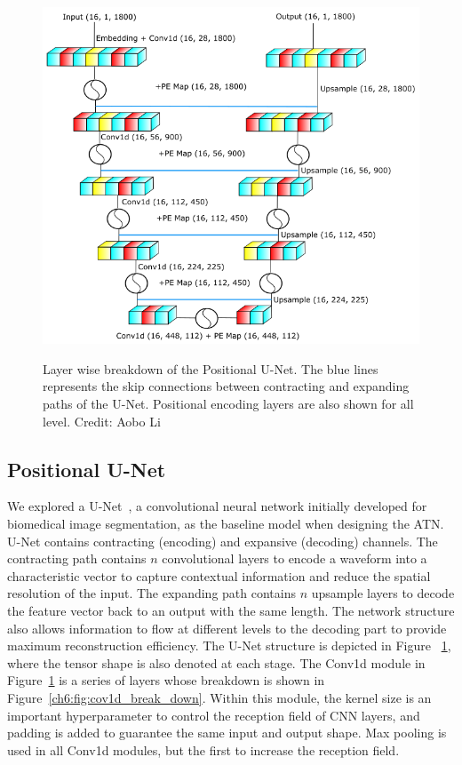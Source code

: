 
\begin{figure}[htb!]
\centering
    \includegraphics[width=0.7\linewidth]{ch6/figs/unet.png}
    \label{fig:cpunet}
    \caption{Layer wise breakdown of the Positional U-Net. The blue lines represents the  skip connections between contracting and expanding paths of the U-Net. Positional encoding layers are also shown for all level. Credit: Aobo Li}
   \label{fig:network_schematic}
\end{figure}



\subsection{Positional U-Net}

We explored a U-Net~\cite{UNet}, a convolutional neural network initially developed for biomedical image segmentation, as the baseline model when designing the ATN. U-Net contains contracting (encoding) and expansive (decoding) channels. The contracting path contains $n$ convolutional layers to encode a waveform into a characteristic vector to capture contextual information and reduce the spatial resolution of the input. The expanding path contains $n$ upsample layers to decode the feature vector back to an output with the same length. The network structure also allows information to flow at different levels to the decoding part to provide maximum reconstruction efficiency. The U-Net structure is depicted in Figure ~\ref{fig:network_schematic}, where the tensor shape is also denoted at each stage. The Conv1d module in Figure~\ref{fig:network_schematic} is a series of layers whose breakdown is shown in Figure~\ref{ch6:fig:cov1d_break_down}. Within this module, the kernel size is an important hyperparameter to control the reception field of CNN layers, and padding is added to guarantee the same input and output shape. Max pooling is used in all Conv1d modules, but the first to increase the reception field. 

